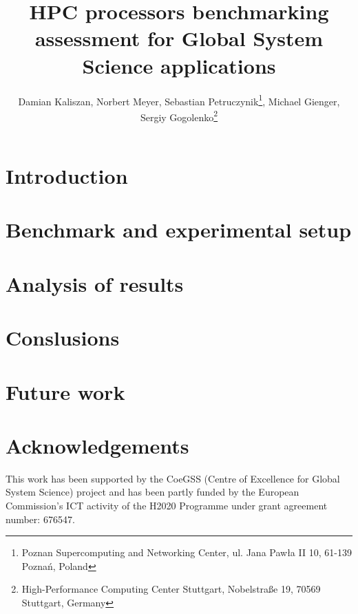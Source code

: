 \documentclass{superfri}
\begin{document}
\author{Damian Kaliszan, Norbert Meyer, Sebastian Petruczynik\footnote{\label{psnc}Poznan Supercomputing and Networking Center, ul. Jana Paw\l a II 10, 61-139 Pozna\'n, Poland}, Michael Gienger, Sergiy Gogolenko\footnote{\label{hlrs}High-Performance Computing Center Stuttgart, Nobelstra\ss{}e 19, 70569 Stuttgart, Germany}}



\title{HPC processors benchmarking assessment for Global System Science applications}

\maketitle{}





\section*{Introduction}
\label{sec:intro}


\section{Benchmark and experimental setup}
\label{sec:benchmark}




\section{Analysis of results}
\label{sec:analysis}


\section{Conslusions}
\label{sec:summary}


\section{Future work}


\section*{Acknowledgements}
This work has been supported by the CoeGSS (Centre of Excellence for Global System Science) project and has been partly funded by the European Commission's ICT activity of the H2020 Programme under grant agreement number: 676547.

\openaccess


\end{document}
